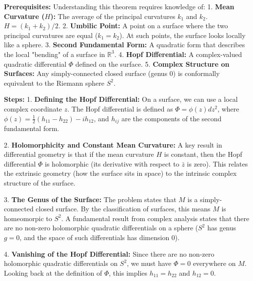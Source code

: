 \begin{solution}
\textbf{Prerequisites:}
Understanding this theorem requires knowledge of:
1. \textbf{Mean Curvature ($H$):} The average of the principal curvatures $k_1$ and $k_2$. $H = (k_1 + k_2)/2$.
2. \textbf{Umbilic Point:} A point on a surface where the two principal curvatures are equal ($k_1 = k_2$). At such points, the surface looks locally like a sphere.
3. \textbf{Second Fundamental Form:} A quadratic form that describes the local "bending" of a surface in $\mathbb{R}^3$.
4. \textbf{Hopf Differential:} A complex-valued quadratic differential $\Phi$ defined on the surface.
5. \textbf{Complex Structure on Surfaces:} Any simply-connected closed surface (genus 0) is conformally equivalent to the Riemann sphere $S^2$.
\par\vspace{\baselineskip}

\textbf{Steps:}
1. \textbf{Defining the Hopf Differential:}
On a surface, we can use a local complex coordinate $z$. The Hopf differential is defined as $\Phi = \phi(z) dz^2$, where $\phi(z) = \frac{1}{2}(h_{11} - h_{22}) - i h_{12}$, and $h_{ij}$ are the components of the second fundamental form.
\par\vspace{\baselineskip}

2. \textbf{Holomorphicity and Constant Mean Curvature:}
A key result in differential geometry is that if the mean curvature $H$ is constant, then the Hopf differential $\Phi$ is holomorphic (its derivative with respect to $\bar{z}$ is zero). This relates the extrinsic geometry (how the surface sits in space) to the intrinsic complex structure of the surface.
\par\vspace{\baselineskip}

3. \textbf{The Genus of the Surface:}
The problem states that $M$ is a simply-connected closed surface. By the classification of surfaces, this means $M$ is homeomorpic to $S^2$. A fundamental result from complex analysis states that there are no non-zero holomorphic quadratic differentials on a sphere ($S^2$ has genus $g=0$, and the space of such differentials has dimension 0).
\par\vspace{\baselineskip}

4. \textbf{Vanishing of the Hopf Differential:}
Since there are no non-zero holomorphic quadratic differentials on $S^2$, we must have $\Phi = 0$ everywhere on $M$. Looking back at the definition of $\Phi$, this implies $h_{11} = h_{22}$ and $h_{12} = 0$.
\par\vspace{\baselineskip}


\end{solution}
